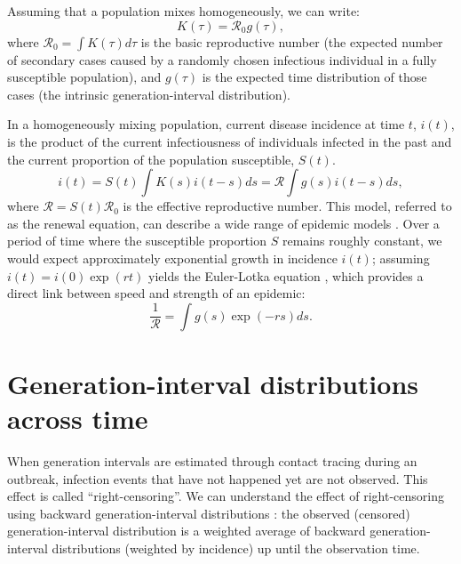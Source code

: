 \documentclass[12pt]{article}
\newcommand{\RR}{\ensuremath{{\mathcal R}}}
\begin{document}
Assuming that a population mixes homogeneously, we can write: 
\begin{equation}
K(\tau) = \RR_0 g(\tau),
\end{equation}
where $\RR_0 = \int K(\tau) d\tau$ is the basic reproductive number (the expected number of secondary cases caused by a randomly chosen infectious individual in a fully susceptible population), 
and $g(\tau)$ is the expected time distribution of those cases (the intrinsic generation-interval distribution).

In a homogeneously mixing population, current disease incidence at time $t$, $i(t)$, is the product of the current infectiousness of individuals infected in the past and the current proportion of the population susceptible, $S(t)$.
\begin{equation}
i(t) = S(t) \int K(s) i(t-s) ds = \RR \int g(s) i(t-s) ds,
\end{equation}
where $\RR = S(t) \RR_0$ is the effective reproductive number.
This model, referred to as the renewal equation, can describe a wide range of epidemic models \citep{heesterbeek1996concept, diekmann2000mathematical, roberts2004modelling, aldis2005integral, wallinga2007generation, roberts2007model}.
Over a period of time where the susceptible proportion $S$ remains roughly constant, we would expect approximately exponential growth in incidence $i(t)$; assuming $i(t) = i(0) \exp(r t)$ yields the Euler-Lotka equation \citep{lotka1907relation}, which provides a direct link between speed and strength of an epidemic:
\begin{equation}
\frac{1}{\RR} = \int g(s) \exp(-r s) ds.
\end{equation}

\section{Generation-interval distributions across time}

When generation intervals are estimated through contact tracing during an outbreak, infection events that have not happened yet are not observed. 
This effect is called ``right-censoring''.
We can understand the effect of right-censoring using backward generation-interval distributions \citep{tomba2010some, nishiura2010time, champredon2015intrinsic, britton2019estimation}:
the observed (censored) generation-interval distribution is a weighted average of backward generation-interval distributions (weighted by incidence) up until the observation time.
\end{document}

